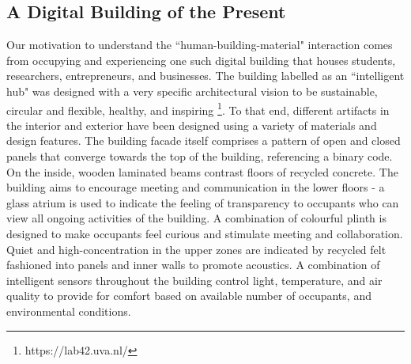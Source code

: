 \documentclass[manuscript, anonymous, review]{acmart}
\begin{document}
\subsection{A Digital Building of the Present}
\label{subsec:building}
Our motivation to understand the ``human-building-material" interaction comes from occupying and experiencing one such digital building that houses students, researchers, entrepreneurs, and businesses. The building labelled as an ``intelligent hub" was designed with a very specific architectural vision to be sustainable, circular and flexible, healthy, and inspiring \footnote{https://lab42.uva.nl/}. To that end, different artifacts in the interior and exterior have been designed using a variety of materials and design features. The building facade itself comprises a pattern of open and closed panels that converge towards the top of the building, referencing a binary code. On the inside, wooden laminated beams contrast floors of recycled concrete. The building aims to encourage meeting and communication in the lower floors - a glass atrium is used to indicate the feeling of transparency to occupants who can view all ongoing activities of the building. A combination of colourful plinth is designed to make occupants feel curious and stimulate meeting and collaboration. Quiet and high-concentration in the upper zones are indicated by recycled felt fashioned into panels and inner walls to promote acoustics. A combination of intelligent sensors throughout the building control light, temperature, and air quality to provide for comfort based on available number of occupants, and environmental conditions. 
\end{document}
